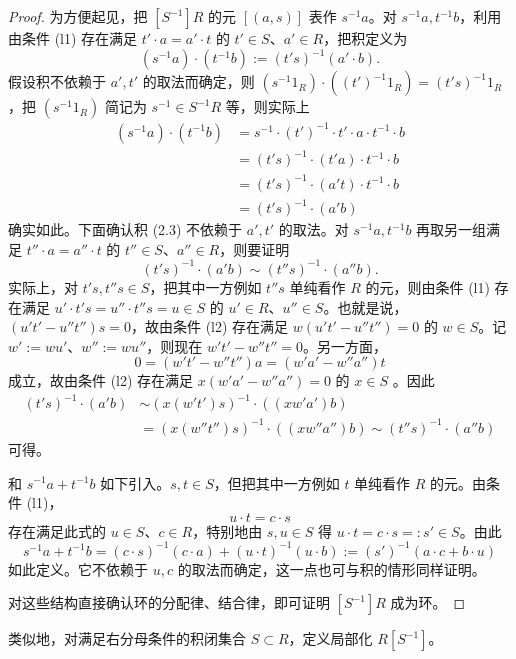 \begin{proof}
为方便起见，把 $[S^{-1}]R$ 的元 $[(a,s)]$ 表作 $s^{-1}a$。对 $s^{-1}a,t^{-1}b$，利用由条件 (l1) 存在满足 $t'\cdot a=a'\cdot t$ 的 $t'\in S$、$a'\in R$，把积定义为
\begin{equation}
  (s^{-1}a)\cdot(t^{-1}b) := (t's)^{-1}(a'\cdot b). \tag{2.3}
\end{equation}
假设积不依赖于 $a',t'$ 的取法而确定，则 $(s^{-1}1_R)\cdot((t')^{-1}1_R)=(t's)^{-1}1_R$，把 $(s^{-1}1_R)$ 简记为 $s^{-1}\in S^{-1}R$ 等，则实际上
\begin{align*}
  (s^{-1}a)\cdot(t^{-1}b) &= s^{-1}\cdot(t')^{-1}\cdot t'\cdot a\cdot t^{-1}\cdot b\\
  &= (t's)^{-1}\cdot(t'a)\cdot t^{-1}\cdot b\\
  &= (t's)^{-1}\cdot(a't)\cdot t^{-1}\cdot b\\
  &= (t's)^{-1}\cdot(a'b)
\end{align*}
确实如此。下面确认积 (2.3) 不依赖于 $a',t'$ 的取法。对 $s^{-1}a,t^{-1}b$ 再取另一组满足 $t''\cdot a=a''\cdot t$ 的 $t''\in S$、$a''\in R$，则要证明
\[
  (t's)^{-1}\cdot(a'b)\sim(t''s)^{-1}\cdot(a''b).
\]
实际上，对 $t's,t''s\in S$，把其中一方例如 $t''s$ 单纯看作 $R$ 的元，则由条件 (l1) 存在满足 $u'\cdot t's=u''\cdot t''s=u\in S$ 的 $u'\in R$、$u''\in S$。也就是说，$(u't'-u''t'')s=0$，故由条件 (l2) 存在满足 $w(u't'-u''t'')=0$ 的 $w\in S$。记 $w':=wu'$、$w'':=wu''$，则现在 $w't'-w''t''=0$。另一方面，
\[
  0=(w't'-w''t'')a=(w'a'-w''a'')t
\]
成立，故由条件 (l2) 存在满足 $x(w'a'-w''a'')=0$ 的 $x\in S$
。因此
\begin{align*}
  (t's)^{-1}\cdot(a'b) &\sim (x(w't')s)^{-1}\cdot((xw'a')b)\\
  &= (x(w''t'')s)^{-1}\cdot((xw''a'')b) \sim (t''s)^{-1}\cdot(a''b)
\end{align*}
可得。

和 $s^{-1}a+t^{-1}b$ 如下引入。$s,t\in S$，但把其中一方例如 $t$ 单纯看作 $R$ 的元。由条件 (l1)，
\[
  u\cdot t=c\cdot s
\]
存在满足此式的 $u\in S$、$c\in R$，特别地由 $s,u\in S$ 得 $u\cdot t=c\cdot s=:s'\in S$。由此
\[
  s^{-1}a+t^{-1}b=(c\cdot s)^{-1}(c\cdot a)+(u\cdot t)^{-1}(u\cdot b):=(s')^{-1}(a\cdot c+b\cdot u)
\]
如此定义。它不依赖于 $u,c$ 的取法而确定，这一点也可与积的情形同样证明。

对这些结构直接确认环的分配律、结合律，即可证明 $[S^{-1}]R$ 成为环。
\end{proof}

类似地，对满足右分母条件的积闭集合 $S\subset R$，定义局部化 $R[S^{-1}]$。

